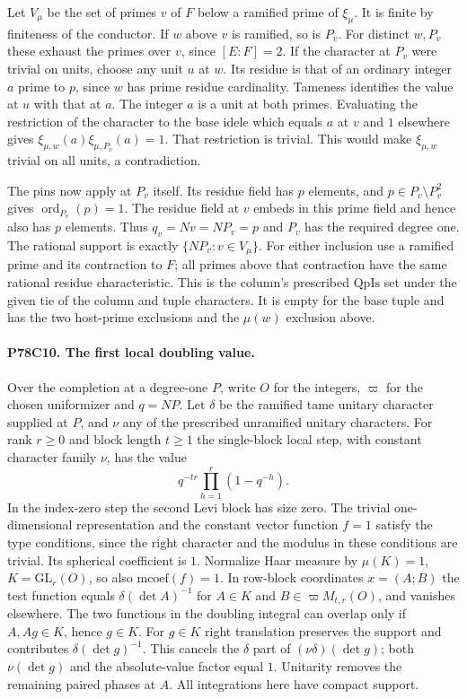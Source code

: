 Let $V_\mu$ be the set of primes $v$ of $F$ below a ramified prime of
$\xi_\mu$. It is finite by finiteness of the conductor. If $w$ above
$v$ is ramified, so is $P_v$. For distinct $w,P_v$ these exhaust the
primes over $v$, since $[E:F]=2$. If the character at $P_v$ were trivial
on units, choose any unit $u$ at $w$. Its residue is that of an ordinary
integer $a$ prime to $p$, since $w$ has prime residue cardinality.
Tameness identifies the value at $u$ with that at $a$. The integer $a$
is a unit at both primes. Evaluating the restriction of the character
to the base idele which equals $a$ at $v$ and $1$ elsewhere gives
$\xi_{\mu,w}(a)\xi_{\mu,P_v}(a)=1$. That restriction is trivial.
This would make $\xi_{\mu,w}$ trivial on all units, a contradiction.

The pins now apply at $P_v$ itself. Its residue field has $p$ elements,
and $p\in P_v\setminus P_v^2$ gives $\operatorname{ord}_{P_v}(p)=1$.
The residue field at $v$ embeds in this prime field and hence also has
$p$ elements. Thus $q_v=Nv=NP_v=p$ and $P_v$ has the required degree
one. The rational support is exactly $\{NP_v:v\in V_\mu\}$. For either
inclusion use a ramified prime and its contraction to $F$; all primes
above that contraction have the same rational residue characteristic.
This is the column's prescribed $\mathrm{QpIs}$ set under the given tie
of the column and tuple characters. It is empty for the base tuple and
has the two host-prime exclusions and the $\mu(w)$ exclusion above.

\paragraph{P78C10. The first local doubling value.}
Over the completion at a degree-one $P$, write $O$ for the integers,
$\varpi$ for the chosen uniformizer and $q=NP$. Let $\delta$ be the
ramified tame unitary character supplied at $P$, and $\nu$ any of the
prescribed unramified unitary characters. For rank $r\ge0$ and block
length $t\ge1$ the single-block local step, with constant character
family $\nu$, has the value
\[
             q^{-tr}\prod_{h=1}^{r}(1-q^{-h}).
\]
In the index-zero step the second Levi block has size zero. The trivial
one-dimensional representation and the constant vector function $f=1$
satisfy the type conditions, since the right character and the modulus
in these conditions are trivial. Its spherical coefficient is $1$.
Normalize Haar measure by $\mu(K)=1$, $K=\mathrm{GL}_r(O)$, so also
$\mathrm{mcoef}(f)=1$. In row-block coordinates $x=(A;B)$ the test
function equals $\delta(\det A)^{-1}$ for $A\in K$ and
$B\in\varpi M_{t,r}(O)$, and vanishes elsewhere. The two functions in
the doubling integral can overlap only if $A,Ag\in K$, hence $g\in K$.
For $g\in K$ right translation preserves the support and contributes
$\delta(\det g)^{-1}$. This cancels the $\delta$ part of
$(\nu\delta)(\det g)$; both $\nu(\det g)$ and the absolute-value
factor equal $1$. Unitarity removes the remaining paired phases at $A$.
All integrations here have compact support.

